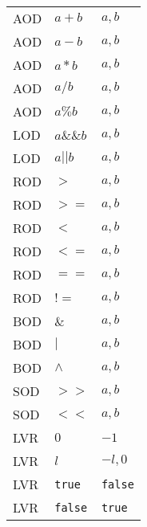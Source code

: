 \begin{table}[h]
\begin{tabular}{lll}
AOD	&	$a + b$	&	$ a, b $	\\
AOD	&	$a - b$	&	$ a, b $	\\
AOD	&	$a * b$	&	$ a, b $	\\
AOD	&	$a / b$	&	$ a, b $	\\
AOD	&	$a \% b$	&	$ a, b $	\\
LOD	&	$a \&\& b$	&	$ a, b $	\\
LOD	&	$a || b$	&	$ a, b $	\\
ROD	&	$>$	&	$ a, b $	\\
ROD	&	$>=$	&	$ a, b $	\\
ROD	&	$<$	&	$ a, b $	\\
ROD	&	$<=$	&	$ a, b $	\\
ROD	&	$==$	&	$ a, b $	\\
ROD	&	$!=$	&	$ a, b $	\\
BOD	&	$\&$	&	$ a, b $	\\
BOD	&	$|$	&	$ a, b $	\\
BOD	&	$\land$	&	$ a, b $	\\
SOD	&	$>>$	&	$ a, b $	\\
SOD	&	$<<$	&	$ a, b $	\\
LVR	&	$0$	&	$-1$	\\
LVR	&	$l$	&	$ -l, 0 $	\\
LVR	&	\texttt{true}	&	\texttt{false}	\\
LVR	&	\texttt{false}	&	\texttt{true}	\\
\hline
\end{tabular}
\end{table}
